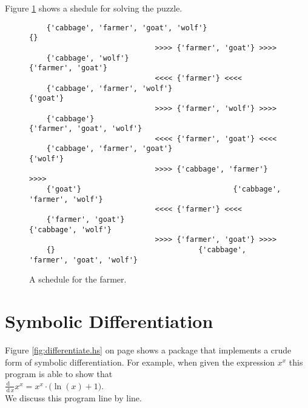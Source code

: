 Figure \ref{fig:wolf-ziege-solution} shows a shedule for solving the puzzle.




\begin{figure}[!ht]
  \centering
\begin{verbatim}
    {'cabbage', 'farmer', 'goat', 'wolf'}                                 {}
                             >>>> {'farmer', 'goat'} >>>> 
    {'cabbage', 'wolf'}                                   {'farmer', 'goat'}
                             <<<< {'farmer'} <<<< 
    {'cabbage', 'farmer', 'wolf'}                                   {'goat'}
                             >>>> {'farmer', 'wolf'} >>>> 
    {'cabbage'}                                   {'farmer', 'goat', 'wolf'}
                             <<<< {'farmer', 'goat'} <<<< 
    {'cabbage', 'farmer', 'goat'}                                   {'wolf'}
                             >>>> {'cabbage', 'farmer'} >>>> 
    {'goat'}                                   {'cabbage', 'farmer', 'wolf'}
                             <<<< {'farmer'} <<<< 
    {'farmer', 'goat'}                                   {'cabbage', 'wolf'}
                             >>>> {'farmer', 'goat'} >>>> 
    {}                                 {'cabbage', 'farmer', 'goat', 'wolf'}
\end{verbatim} 
\vspace*{-0.3cm}
\caption{A schedule for the farmer.}  
\label{fig:wolf-ziege-solution}
\end{figure}

\FloatBarrier

\section{Symbolic Differentiation}
Figure \ref{fig:differentiate.hs} on page \pageref{fig:differentiate.hs}
shows a package that implements a crude form of symbolic differentiation.  For example, when given the
expression $x^x$ this program is able to show that 
\\[0.2cm]
\hspace*{1.3cm}
$\frac{\,\mathrm{d}\;\;\,}{\,\mathrm{d}\,x} x^x = x^x \cdot \bigl( \ln(x) + 1 \bigr)$.
\\[0.2cm]
We discuss this program line by line.

